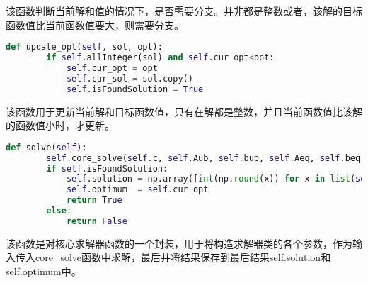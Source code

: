 该函数判断当前解和值的情况下，是否需要分支。并非都是整数或者，该解的目标函数值比当前函数值要大，则需要分支。

\begin{lstlisting}[language=python]
    def update_opt(self, sol, opt):
        if self.allInteger(sol) and self.cur_opt<opt:
            self.cur_opt = opt
            self.cur_sol = sol.copy()
            self.isFoundSolution = True
\end{lstlisting}
该函数用于更新当前解和目标函数值，只有在解都是整数，并且当前函数值比该解的函数值小时，才更新。

\begin{lstlisting}[language=python]
    def solve(self):
        self.core_solve(self.c, self.Aub, self.bub, self.Aeq, self.beq, self.bounds)
        if self.isFoundSolution:
            self.solution = np.array([int(np.round(x)) for x in list(self.cur_sol)])
            self.optimum  = self.cur_opt
            return True
        else:
            return False
\end{lstlisting}
该函数是对核心求解器函数的一个封装，用于将构造求解器类的各个参数，作为输入传入core\_solve函数中求解，最后并将结果保存到最后结果self.solution和self.optimum中。